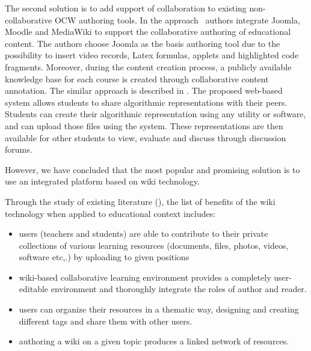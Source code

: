 \documentclass[ngerman,UKenglish,table]{scrbook}
\makeatletter
\newcommand{\todo}[1]{\textcolor{red}{@TODO: #1}}
\makeatother
\begin{document}
The second solution is to add support of collaboration to existing non-collaborative OCW authoring tools.
In the approach~\cite{Greenhow2009} authors integrate Joomla, Moodle and MediaWiki to support the collaborative authoring of educational content.
The authors choose Joomla as the basis authoring tool due to the possibility to insert video records, Latex formulas, applets and highlighted code fragments.
Moreover, during the content creation process, a publicly available knowledge base for each course is created through collaborative content annotation.
The similar approach is described in \cite{hubscher2003constructive}.
The proposed web-based system allows students to share algorithmic representations with their peers.
Students can create their algorithmic representation using any utility or software, and can upload those files using the system.
These representations are then available for other students to view, evaluate and discuss through discussion forums.

However, we have concluded that the most popular and promising solution is to use an integrated platform based on wiki technology. 




Through the study of existing literature (\cite{Jiake2010, Gokcearslan2011}),  the list of benefits of the wiki technology when applied to educational context includes:
\begin{itemize}
\item users (teachers and students) are able to contribute to their private collections of various learning resources (documents, files, photos, videos, software etc,.) by uploading to given positions
\item wiki-based collaborative learning environment provides a completely user-editable environment and thoroughly integrate the roles of author and reader.  
\item users can organize their resources in a thematic way, designing and creating different tags and share them with other users.
\item authoring a wiki on a given topic produces a linked network of resources.
\end{itemize}
\end{document}

